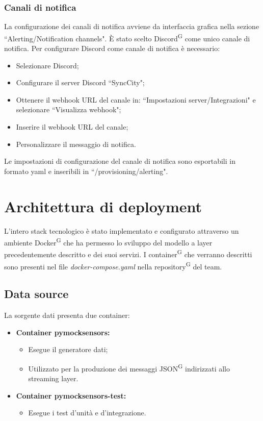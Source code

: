 \documentclass[8pt]{article}
\newcommand{\glossterm}[1]{#1\textsuperscript{G}} %
\begin{document}
\subsubsection{Canali di notifica}
La configurazione dei canali di notifica avviene da interfaccia grafica nella sezione ``Alerting/Notification channels".
È stato scelto \glossterm{Discord} come unico canale di notifica.
Per configurare Discord come canale di notifica è necessario:
\begin{itemize}
	\setlength\itemsep{0em}
    \item Selezionare Discord;
    \item Configurare il server Discord ``SyncCity";
    \item Ottenere il webhook URL del canale in: ``Impostazioni server/Integrazioni" e selezionare ``Visualizza webhook";
    \item Inserire il webhook URL del canale;
    \item Personalizzare il messaggio di notifica.
\end{itemize}
Le impostazioni di configurazione del canale di notifica sono esportabili in formato yaml e inseribili in ``/provisioning/alerting".
\newpage
\section{Architettura di deployment}\label{sec:dep}
L’intero stack tecnologico è stato implementato e configurato attraverso un ambiente \glossterm{Docker} che ha permesso lo sviluppo del modello a layer precedentemente descritto e dei suoi servizi. I \glossterm{container} che verranno descritti sono presenti nel file \textit{docker-compose.yaml} nella \glossterm{repository} del team.
\subsection{Data source}
La sorgente dati presenta due container:
\begin{itemize}
	\setlength\itemsep{0em}
    \item \textbf{Container pymocksensors:}
    \begin{itemize}
	\setlength\itemsep{0em}
        \item Esegue il generatore dati;
        \item Utilizzato per la produzione dei messaggi \glossterm{JSON} indirizzati allo streaming layer.
    \end{itemize}
    \item \textbf{Container pymocksensors-test:}
    \begin{itemize}
	\setlength\itemsep{0em}
        \item Esegue i test d'unità e d'integrazione.
    \end{itemize}
\end{itemize}
\end{document}
